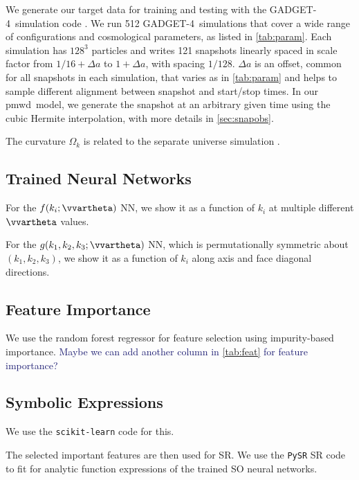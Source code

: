 \documentclass[modern, trackchanges, dvipsnames]{aastex631}
\newcommand{\pmwd}{{\usefont{T1}{nova}{m}{sl}pmwd}}
\newcommand{\GADGET}{{{\fontsize{10pt}{12pt}\selectfont GADGET}-4}}
\newcommand{\YZ}[1]{\textcolor{MidnightBlue}{#1}}
\begin{document}
We generate our target data for training and testing with the \GADGET\
simulation code \citep{GADGET-4}.
We run 512 \GADGET\ simulations that cover a wide range of
configurations and cosmological parameters, as listed in
\autoref{tab:param}.
Each simulation has $128^3$ particles and writes 121 snapshots linearly
spaced in scale factor from $1/16 + \Delta a$ to $1 + \Delta a$, with
spacing $1/128$.
$\Delta a$ is an offset, common for all snapshots in each simulation,
that varies as in \autoref{tab:param} and helps to sample different
alignment between snapshot and start/stop times.
In our \pmwd\ model, we generate the snapshot at an arbitrary given time using
the cubic Hermite interpolation, with more details in \autoref{sec:snapobs}.

The curvature $\Omega_k$ is related to the separate universe simulation
\citep{LiEtAl2014, WagnerEtAl2015}.



\subsection{Trained Neural Networks}

For the $f(k_i; \vvartheta)$ NN, we show it as a function of $k_i$ at multiple
different $\vvartheta$ values.

For the $g(k_1,k_2,k_3;\vvartheta)$ NN, which is permutationally symmetric about
$(k_1, k_2, k_3)$, we show it as a function of $k_i$ along axis and face
diagonal directions.


\subsection{Feature Importance}
We use the random forest regressor for feature selection using impurity-based
importance.
\YZ{Maybe we can add another column in \autoref{tab:feat} for feature
importance?}


\subsection{Symbolic Expressions}
We use the \texttt{scikit-learn} \citep{scikit-learn} code for this.

The selected important features are then used for SR.
We use the \texttt{PySR} \citep{PySR} SR code to fit for analytic
function expressions of the trained SO neural networks.
\end{document}
